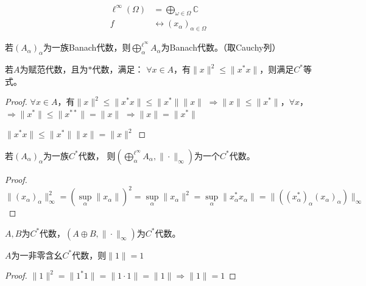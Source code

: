 \documentclass[lang=cn,a4paper,newtx,section]{elegantbook}
\begin{document}
\begin{example}
  \begin{equation*}
    \begin{aligned}
      \ell^\infty(\Omega) &= \bigoplus\limits_{\omega \in \Omega} \mathbb{C} \\
      f &\longleftrightarrow (x_\alpha)_{\alpha \in \Omega}
    \end{aligned}
  \end{equation*}
\end{example}

\begin{lemma}
  若$(A_\alpha)_\alpha$为一族Banach代数，则$\bigoplus\limits_\alpha^{\ell^\infty} A_\alpha$为Banach代数。（取Cauchy列）
\end{lemma}

\begin{proposition}
  若$A$为赋范代数，且为$*$代数，满足：
   $\forall x \in A$，有$\|x\|^2 \leq \|x^*x\|$，则满足$C^*$等式。
\end{proposition}

\begin{proof}
  $\forall x \in A$，有$\|x\|^2 \leq \|x^*x\| \leq \|x^*\| \|x\|$
  $\Rightarrow \|x\| \leq \|x^*\|$，$\forall x$，$\Rightarrow \|x^*\| \leq \|x^{**}\| = \|x\|$
  $\Rightarrow \|x\| = \|x^*\|$
  
  $\|x^*x\| \leq \|x^*\| \|x\| = \|x\|^2$
\end{proof}

\begin{proposition}
  若$(A_\alpha)_\alpha$为一族$C^*$代数，
   则$(\bigoplus\limits_\alpha^{\ell^\infty} A_\alpha, \|\cdot\|_\infty)$为一个$C^*$代数。
\end{proposition}

\begin{proof}
  $\|(x_\alpha)_\alpha\|_\infty^2 = (\sup\limits_\alpha \|x_\alpha\|)^2 = \sup\limits_\alpha \|x_\alpha\|^2 = \sup\limits_\alpha \|x_\alpha^* x_\alpha\| = \|((x_\alpha^*)_\alpha (x_\alpha)_\alpha)\|_\infty$
\end{proof}

\begin{example}
  $A, B$为$C^*$代数，$(A \oplus B, \|\cdot\|_\infty)$为$C^*$代数。
\end{example}

\begin{proposition}
  $A$为一非零含幺$C^*$代数，则$\|1\| = 1$
\end{proposition}

\begin{proof}
  $\|1\|^2 = \|1^*1\| = \|1 \cdot 1\| = \|1\| \Rightarrow \|1\| = 1$
\end{proof}
\end{document}
